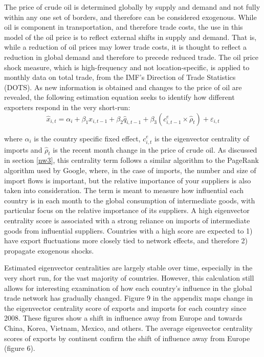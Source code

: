 \documentclass[10pt,letterpaper]{article}
\begin{document}
The price of crude oil is determined globally by supply and demand and not fully within any one set of borders, and therefore can be considered exogenous. While oil is component in transportation, and therefore trade costs, the use in this model of the oil price is to reflect external shifts in supply and demand. That is, while a reduction of oil prices may lower trade costs, it is thought to reflect a reduction in global demand and therefore to precede reduced trade. The oil price shock measure, which is high-frequency and not location-specific, is applied to monthly data on total trade, from the IMF's Direction of Trade Statistics (DOTS). As new information is obtained and changes to the price of oil are revealed, the following estimation equation seeks to identify how different exporters respond in the very short-run:
\begin{equation}
\hat{x}_{i,t} = \alpha_{i} + \beta_1 x_{i,t-1} + \beta_2 \hat{q}_{i,t-1} + \beta_3 (c^e_{i,t-1} \times \hat{\rho}_{t}) + \varepsilon_{i,t}
\end{equation}

where $\alpha_{i}$ is the country specific fixed effect, $c^e_{i,t}$ is the eigenvector centrality of imports and $\hat{\rho}_{t}$ is the recent month change in the price of crude oil. As discussed in section \ref{nw3}, this centrality term follows a similar algorithm to the PageRank algorithm used by Google, where, in the case of imports, the number and size of import flows is important, but the relative importance of your suppliers is also taken into consideration. The term is meant to measure how influential each country is in each month to the global consumption of intermediate goods, with particular focus on the relative importance of its suppliers. A high eigenvector centrality score is associated with a strong reliance on imports of intermediate goods from influential suppliers. Countries with a high score are expected to 1) have export fluctuations more closely tied to network effects, and therefore 2) propagate exogenous shocks.

Estimated eigenvector centralities are largely stable over time, especially in the very short run, for the vast majority of countries. However, this calculation still allows for interesting examination of how each country's influence in the global trade network has gradually changed. Figure 9 in the appendix maps change in the eigenvector centrality score of exports and imports for each country since 2008. These figures show a shift in influence away from Europe and towards China, Korea, Vietnam, Mexico, and others. The average eigenvector centrality scores of exports by continent confirm the shift of influence away from Europe (figure 6).
\end{document}
